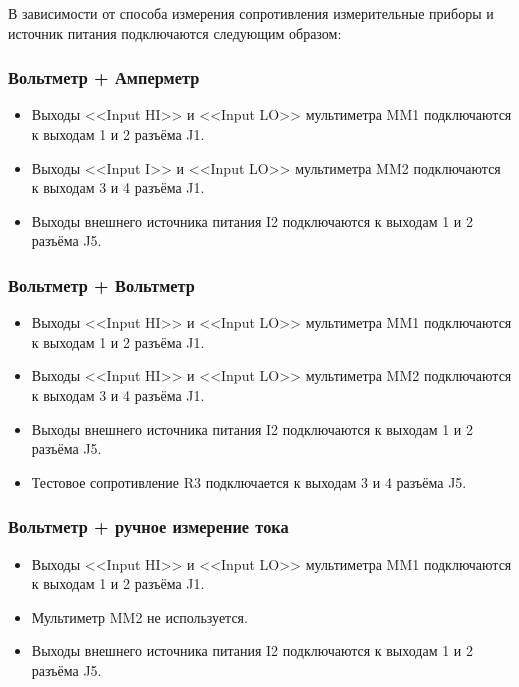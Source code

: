 В зависимости от способа измерения сопротивления измерительные приборы и источник питания подключаются следующим образом:

\subsubsection{Вольтметр + Амперметр}

    \begin{itemize}
        \item Выходы <<Input HI>> и <<Input LO>> мультиметра MM1 подключаются к выходам 1 и 2 разъёма J1. 
        \item Выходы <<Input I>> и <<Input LO>> мультиметра MM2 подключаются к выходам 3 и 4 разъёма J1. 
        \item Выходы внешнего источника питания I2 подключаются к выходам 1 и 2 разъёма J5. 
    \end{itemize}

\subsubsection{Вольтметр + Вольтметр}

    \begin{itemize}
        \item Выходы <<Input HI>> и <<Input LO>> мультиметра MM1 подключаются к выходам 1 и 2 разъёма J1. 
        \item Выходы <<Input HI>> и <<Input LO>> мультиметра MM2 подключаются к выходам 3 и 4 разъёма J1. 
        \item Выходы внешнего источника питания I2 подключаются к выходам 1 и 2 разъёма J5. 
        \item Тестовое сопротивление R3 подключается к выходам 3 и 4 разъёма J5. 
    \end{itemize}
        
\subsubsection{Вольтметр + ручное измерение тока}

    \begin{itemize}
        \item Выходы <<Input HI>> и <<Input LO>> мультиметра MM1 подключаются к выходам 1 и 2 разъёма J1. 
        \item Мультиметр MM2 не используется. 
        \item Выходы внешнего источника питания I2 подключаются к выходам 1 и 2 разъёма J5. 
    \end{itemize}
        
